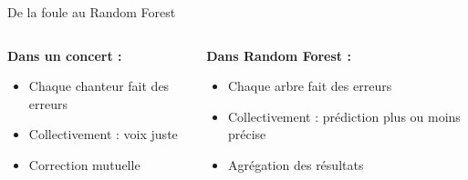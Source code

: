 \documentclass{beamer}
\begin{document}
	\begin{frame}{De la foule au Random Forest}
		\begin{columns}
			\begin{column}{0.5\textwidth}
				\textbf{Dans un concert :}
				\begin{itemize}
					\item<1-> Chaque chanteur fait des erreurs
					\item<2-> Collectivement : voix juste
					\item<3-> Correction mutuelle
				\end{itemize}
			\end{column}
			\begin{column}{0.5\textwidth}
				\textbf{Dans Random Forest :}
				\begin{itemize}
					\item<1-> Chaque arbre fait des erreurs
					\item<2-> Collectivement : prédiction plus ou moins précise
					\item<3-> Agrégation des résultats
				\end{itemize}
			\end{column}
		\end{columns}
		
		\vspace{0.5cm}
		\begin{center}
		\end{center}
	\end{frame}
	
\end{document}
